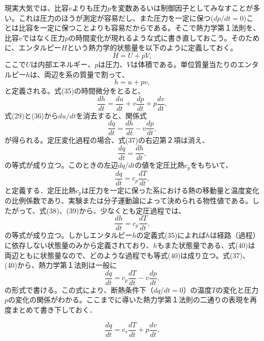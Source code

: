 \documentclass{jsarticle}
\begin{document}
現実大気では、比容$v$よりも圧力$p$を変数あるいは制御因子としてみなすことが多い。これは圧力のほうが測定が容易だし、また圧力を一定に保つ($dp/dt =0$)ことは比容を一定に保つことよりも容易だからである。そこで熱力学第１法則を、比容$v$ではなく圧力$p$の時間変化が現れるような式に書き直しておこう。そのために、エンタルピー$H$という熱力学的状態量を以下のように定義しておく。
\begin{equation}
 H=U+pV,
\end{equation}
ここで$U$は内部エネルギー、$p$は圧力、$V$は体積である。単位質量当たりのエンタルピー$h$は、両辺を系の質量で割って、
\begin{equation}
 h=u+pv,
\end{equation}
と定義される。式(35)の時間微分をとると、
\begin{equation}
 \frac{dh}{dt}=\frac{du}{dt}+v\frac{dp}{dt}+p\frac{dv}{dt},
\end{equation}
式(29)と(36)から$du/dt$を消去すると、関係式
\begin{equation}
 \frac{dq}{dt}=\frac{dh}{dt}-v\frac{dp}{dt},
\end{equation}
が得られる。定圧変化過程の場合、式(37)の右辺第２項は消え、
\begin{equation}
 \frac{dq}{dt}=\frac{dh}{dt},
\end{equation}
の等式が成り立つ。このときの左辺$dq/dt$の値を定圧比熱$c_{p}$をもちいて、
\begin{equation}
 \frac{dq}{dt}=c_{p}\frac{dT}{dt},
\end{equation}
と定義する．定圧比熱$c_{p}$は圧力を一定に保った系における熱の移動量と温度変化の比例係数であり、実験または分子運動論によって決められる物性値である。したがって、式(38)、(39)から、少なくとも定圧過程では、
\begin{equation}
 \frac{dh}{dt}=c_{p}\frac{dT}{dt},
\end{equation}
の等式が成り立つ。しかしエンタルピー$h$の定義式(35)によれば$h$は経路（過程）に依存しない状態量のみから定義されており、$h$もまた状態量である、式(40)は両辺ともに状態量なので、どのような過程でも等式(40)は成り立つ。式(37)、(40)から、熱力学第１法則は一般に
\begin{equation}
 \frac{dq}{dt}=c_{p}\frac{dT}{dt}-v\frac{dp}{dt},
\end{equation}
の形式で書ける。この式により、断熱条件下（$dq/dt=0$）の温度$T$の変化と圧力$p$の変化の関係がわかる。ここまでに導いた熱力学第１法則の二通りの表現を再度まとめて書き下しておく．

\begin{equation}
 \frac{dq}{dt}=c_{v}\frac{dT}{dt}+p\frac{dv}{dt},
\end{equation}
\end{document}
